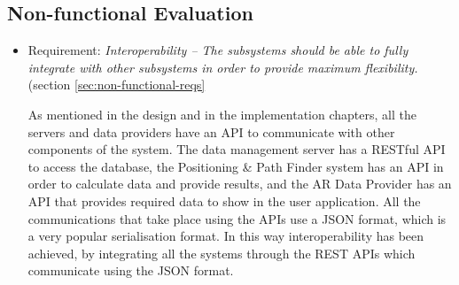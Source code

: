 \subsection{Non-functional Evaluation}
\begin{itemize}
    \item Requirement: \textit{Interoperability – The subsystems should be able to fully integrate with other subsystems in order to provide maximum flexibility.} (section \ref{sec:non-functional-reqs}
    
    As mentioned in the design and in the implementation chapters, all the servers and data providers have an API to communicate with other components of the system. The data management server has a RESTful API to access the database, the Positioning \& Path Finder system has an API in order to calculate data and provide results, and the AR Data Provider has an API that provides required data to show in the user application. All the communications that take place using the APIs use a JSON format, which is a very popular serialisation format. In this way interoperability has been achieved, by integrating all the systems through the REST APIs which communicate using the JSON format.
    

\end{itemize}
